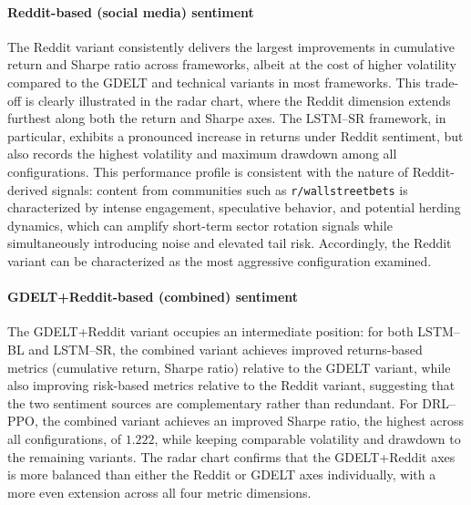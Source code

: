 \paragraph{Reddit-based (social media) sentiment} The Reddit variant consistently delivers the largest improvements in cumulative return and Sharpe ratio across frameworks, albeit at the cost of higher volatility compared to the GDELT and technical variants in most frameworks. This trade-off is clearly illustrated in the radar chart, where the Reddit dimension extends furthest along both the return and Sharpe axes. The LSTM--SR framework, in particular, exhibits a pronounced increase in returns under Reddit sentiment, but also records the highest volatility and maximum drawdown among all configurations. This performance profile is consistent with the nature of Reddit-derived signals: content from communities such as \texttt{r/wallstreetbets} is characterized by intense engagement, speculative behavior, and potential herding dynamics, which can amplify short-term sector rotation signals while simultaneously introducing noise and elevated tail risk. Accordingly, the Reddit variant can be characterized as the most aggressive configuration examined.

\paragraph{GDELT+Reddit-based (combined) sentiment} The GDELT+Reddit variant occupies an intermediate position: for both LSTM--BL and LSTM--SR, the combined variant achieves improved returns-based metrics (cumulative return, Sharpe ratio) relative to the GDELT variant, while also improving risk-based metrics relative to the Reddit variant, suggesting that the two sentiment sources are complementary rather than redundant. For DRL--PPO, the combined variant achieves an improved Sharpe ratio, the highest across all configurations, of $1.222$, while keeping comparable volatility and drawdown to the remaining variants. The radar chart confirms that the GDELT+Reddit axes is more balanced than either the Reddit or GDELT axes individually, with a more even extension across all four metric dimensions.

